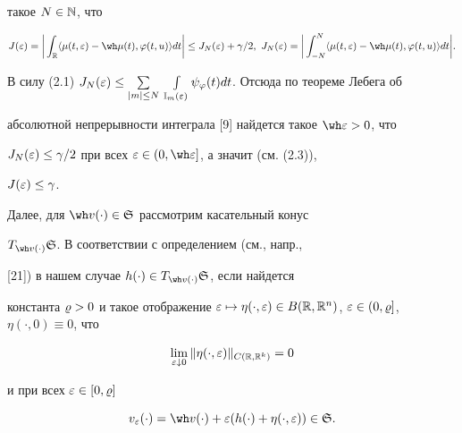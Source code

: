 такое $N\in\Bbb N$, что


\begin{equation}


J(\ve)=\bigg|\int_{\R}\la\mu(t,\ve)-\wh\mu(t),\varphi(t,u)\ra dt\bigg|\le


J_{N}(\ve)+\gamma/2,\ J_{N}(\ve)=


\bigg|\int_{-N}^{N}\la\mu(t,\ve)-\wh\mu(t),\varphi(t,u)\ra dt\bigg|.


\end{equation}


В силу (2.1) $J_{N}(\ve)\le\sum\lt_{|m|\le N}


\;\int\lt_{\Bbb I_{m}(\ve)}\psi_{\varphi}(t)dt$. Отсюда по теореме Лебега об


абсолютной непрерывности интеграла [9] найдется такое $\wh\ve>0$, что


$J_{N}(\varepsilon)\le\gamma/2$ при всех $\ve\in(0,\wh\ve]$, а значит (см. (2.3)),


$J(\varepsilon)\le\gamma$.





Далее, для $\wh v(\cdot)\in\gS$ рассмотрим касательный конус


$T_{\wh v(\cdot)}\gS$. В соответствии с определением (см., напр.,


[21]) в нашем случае $h(\cdot)\in T_{\wh v(\cdot)}\gS$, если найдется


константа $\vr>0$ и такое отображение $\ve\mapsto\eta(\cdot,\ve)\in


B(\R,\R^{n})$, $\ve\in(0,\vr]$, $\eta(\cdot,0)\equiv0$, что


\begin{equation}


\lim\lt_{\ve\downarrow0}\|\eta(\cdot,\ve)\|_{C(\R,\R^{k})}=0


\end{equation}


и при всех $\varepsilon\in[0,\varrho]$


\begin{equation}


v_{\ve}(\cdot)=\wh v(\cdot)+\ve(h(\cdot)+\eta(\cdot,\ve))\in\gS.


\end{equation}





